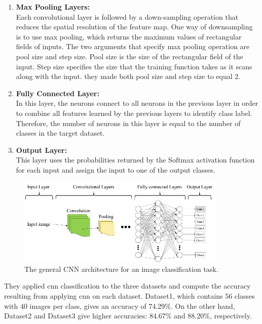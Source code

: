 \begin{itemize}[labelindent=1em,labelsep=0.25cm,leftmargin=*]
\begin{enumerate}
        \item {\textbf{Max Pooling Layers:}} \\
Each convolutional layer is
followed by a down-sampling operation that reduces the
spatial resolution of the feature map. One way of downsampling
is to use max pooling, which returns the maximum
values of rectangular fields of inputs. The two arguments that
specify max pooling operation are pool size and step size.
Pool size is the size of the rectangular field of the input. Step
size specifies the size that the training function takes as it
scans along with the input. they made both pool size and step size
to equal 2.

        \item {\textbf{Fully Connected Layer:}}\\
In this layer, the neurons
connect to all neurons in the previous layer in order to
combine all features learned by the previous layers to identify
class label. Therefore, the number of neurons in this layer is
equal to the number of classes in the target dataset.

        \item {\textbf{Output Layer:}}\\
This layer uses the probabilities
returned by the Softmax activation function for each input
and assign the input to one of the output classes.
        \end{enumerate}
        
        \begin{figure}[!htb]
        \centering
        \includegraphics[width=10cm]{images/cnn_leyar.png}
        \caption{The general CNN architecture for an image classification task.}
        \label{fig:cnn_leyar}
        \end{figure}
        
    \end{itemize}
They applied \acrshort{cnn} classification to the three datasets and
compute the accuracy resulting from applying \acrshort{cnn} on each
dataset. Dataset1, which contains 56 classes with 40 images
per class, gives an accuracy of 74.29\%. On the other hand,
Dataset2 and Dataset3 give higher accuracies: 84.67\% and
88.20\%, respectively.

